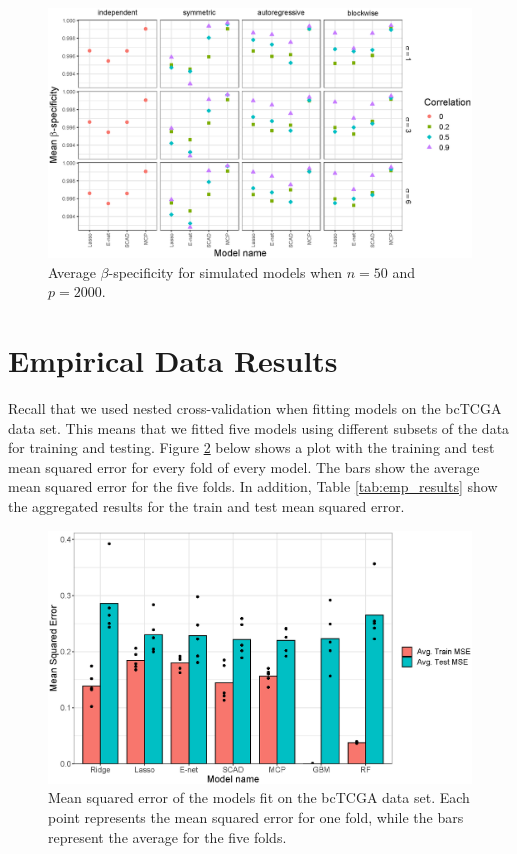 \documentclass{article}
\begin{document}
\begin{figure}[h!]
	\centering
	\includegraphics[width = \textwidth]{images/facet-specificity/facet_specificity_50_2000.eps}
	\captionsetup{width = 0.8\textwidth}
	\caption{Average $\beta$-specificity for simulated models when $n = 50$ and $p = 2000$.}
	\label{fig:specificity-50-2000}
\end{figure}

\section{Empirical Data Results}
Recall that we used nested cross-validation when fitting models on the bcTCGA data set. This means that we fitted five models using different subsets of the data for training and testing. Figure \ref{fig:empirical_mse} below shows a plot with the training and test mean squared error for every fold of every model. The bars show the average mean squared error for the five folds. In addition, Table \ref{tab:emp_results} show the aggregated results for the train and test mean squared error.

\begin{figure}[h!]
	\centering
	\includegraphics[width = 0.8\linewidth]{images/empirical_mse.eps}
	\captionsetup{width = 0.8\textwidth}
	\caption{Mean squared error of the models fit on the bcTCGA data set. Each point represents the mean squared error for one fold, while the bars represent the average for the five folds.}
	\label{fig:empirical_mse}
\end{figure}
\end{document}
